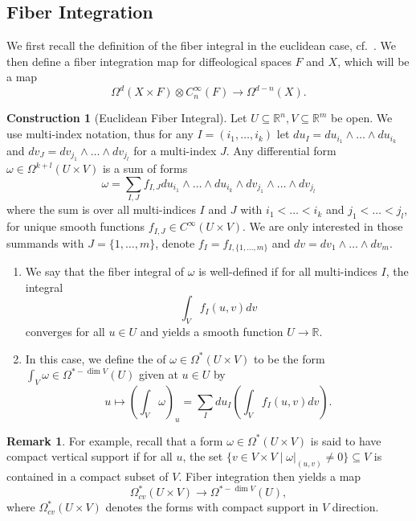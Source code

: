 \documentclass{scrartcl}
\let\emph\relax
\theoremstyle{plain}
\theoremstyle{definition}
\newtheorem{remark}[theorem]{Remark}
\newtheorem{construction}[theorem]{Construction}
\newcommand{\R}{\mathbb R}
\renewcommand{\subset}{\subseteq}
\begin{document}



\subsection{Fiber Integration}\label{subsec:fiber-integration}
We first recall the definition of the fiber integral in the euclidean case, cf.\ \cite{bott1982differential}. We then define a fiber integration map for diffeological spaces $F$ and $X$, which will be a map
$$\Omega^d(X\times F) \otimes C_n^\infty(F)\to\Omega^{d-n}(X).$$

\begin{construction} [Euclidean Fiber Integral]

    Let $U\subset \R^n, V\subset\R^m$ be open. We use multi-index notation, thus for any $I=(i_1, \dots, i_k)$ let $du_I = du_{i_1}\wedge\dots \wedge du_{i_k}$ and  $dv_J=dv_{j_1}\wedge\dots\wedge dv_{j_l}$ for a multi-index $J$. Any differential form $\omega\in\Omega^{k+l}(U\times V)$ is a sum of forms $$\omega = \sum_{I, J} f_{I, J} du_{i_1}\wedge\dots \wedge du_{i_k}\wedge dv_{j_1}\wedge\dots\wedge dv_{j_l}$$ where the sum is over all multi-indices $I$ and $J$ with $i_1<\dots<i_k$ and $j_1<\dots<j_l$, for unique smooth functions $f_{I,J}\in C^\infty(U\times V)$. We are only interested in those summands with $J=\{1, \dots, m\}$, denote $f_I = f_{I, \{1, \dots, m\}}$ and $dv = dv_1\wedge\dots\wedge dv_m$. 
    \begin{enumerate}
    \item We say that the fiber integral of $\omega$ is well-defined if for all  multi-indices $I$, the integral $$\int_V f_{I}(u, v) dv$$ converges for all $u\in U$ and yields a smooth function $U\to \R$. 
    
    \item In this case, we define the \emph{fiber integral} of $\omega\in \Omega^*(U\times V)$ to be the form $\int_V \omega\in\Omega^{*-\dim V}(U)$ given at $u\in U$ by
    $$u\mapsto \left(\int_V \omega\right)_u = \sum_I du_I \left(\int_V f_{I}(u, v) dv\right).$$
    \end{enumerate}
\end{construction}
\begin{remark}
For example, recall that a form $\omega\in \Omega^*(U\times V)$ is said to have  compact vertical support if for all $u$, the set $\{v\in V\times V\mid \omega|_{(u, v)}\neq 0\}\subset V$ is contained in a compact subset of $V$. Fiber integration then yields a map $$\Omega^*_{cv}(U\times V)\to \Omega^{*-\dim V}(U),$$ where $\Omega^*_{cv}(U\times V)$ denotes the forms with compact support in $V$ direction. 
\end{remark}
\end{document}

